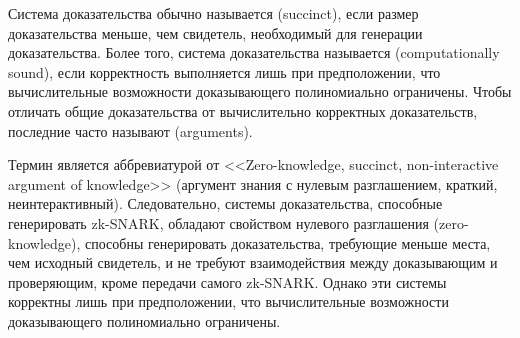 Система доказательства обычно называется  (succinct), если размер доказательства меньше, чем свидетель, необходимый для генерации доказательства. Более того, система доказательства называется  (computationally sound), если корректность выполняется лишь при предположении, что вычислительные возможности доказывающего полиномиально ограничены. Чтобы отличать общие доказательства от вычислительно корректных доказательств, последние часто называют  (arguments).

Термин  является аббревиатурой от <<Zero-knowledge, succinct, non-interactive argument of knowledge>> (аргумент знания с нулевым разглашением, краткий, неинтерактивный). Следовательно, системы доказательства, способные генерировать zk-SNARK, обладают свойством нулевого разглашения (zero-knowledge), способны генерировать доказательства, требующие меньше места, чем исходный свидетель, и не требуют взаимодействия между доказывающим и проверяющим, кроме передачи самого zk-SNARK. Однако эти системы корректны лишь при предположении, что вычислительные возможности доказывающего полиномиально ограничены.
